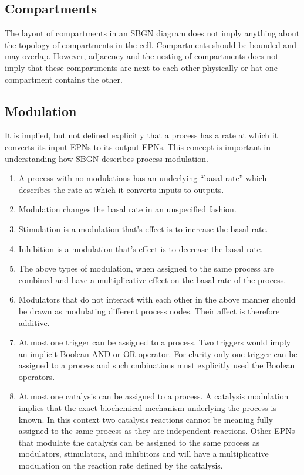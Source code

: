 \subsection{Compartments}

The layout of compartments in an SBGN diagram does not imply anything
about the topology of compartments in the cell. Compartments should be
bounded and may overlap. However, adjacency and the nesting of
compartments does not imply that these compartments are next to each
other physically or hat one compartment contains the other.

\subsection{Modulation}

It is implied, but not defined explicitly that a process has a rate at
which it converts its input EPNs to its output EPNs. This concept is
important in understanding how SBGN describes process modulation.

\begin{enumerate}
\item A process with no modulations has an underlying ``basal rate''
  which describes the rate at which it converts inputs to outputs.
\item Modulation changes the basal rate in an unspecified fashion.
\item Stimulation is a modulation that's effect is to increase the basal rate.
\item Inhibition is a modulation that's effect is to decrease the basal rate.
\item The above types of modulation, when assigned to the same process are combined and have a multiplicative effect on the basal rate of the process.
\item Modulators that do not interact with each other in the above manner should be drawn as modulating different process nodes. Their affect is therefore additive.
\item At most one trigger can be assigned to a process. Two triggers
  would imply an implicit Boolean AND or OR operator. For clarity only
  one trigger can be assigned to a process and such cmbinations must
  explicitly used the Boolean operators.
\item At most one catalysis can be assigned to a process. A catalysis
  modulation implies that the exact biochemical mechanism underlying
  the process is known. In this context two catalysis reactions cannot
  be meaning fully assigned to the same process as they are
  independent reactions. Other EPNs that modulate the catalysis can be
  assigned to the same process as modulators, stimulators, and
  inhibitors and will have a multiplicative modulation on the reaction
  rate defined by the catalysis.
\end{enumerate}

